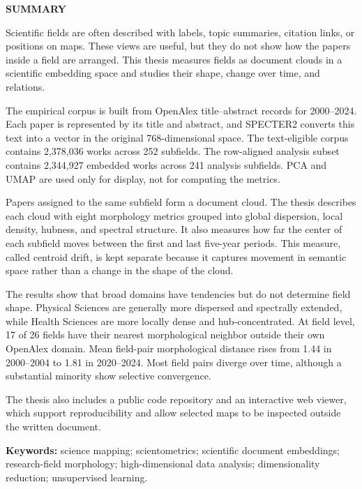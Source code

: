 \documentclass[12pt]{report} %
\begin{document}

\thispagestyle{plain}
\begin{center}
{\large\bfseries\uppercase{Summary}}
\end{center}

\noindent Scientific fields are often described with labels, topic summaries, citation links, or positions on maps. These views are useful, but they do not show how the papers inside a field are arranged. This thesis measures fields as document clouds in a scientific embedding space and studies their shape, change over time, and relations.

The empirical corpus is built from OpenAlex title--abstract records for 2000--2024. Each paper is represented by its title and abstract, and SPECTER2 converts this text into a vector in the original 768-dimensional space. The text-eligible corpus contains 2,378,036 works across 252 subfields. The row-aligned analysis subset contains 2,344,927 embedded works across 241 analysis subfields. PCA and UMAP are used only for display, not for computing the metrics.

Papers assigned to the same subfield form a document cloud. The thesis describes each cloud with eight morphology metrics grouped into global dispersion, local density, hubness, and spectral structure. It also measures how far the center of each subfield moves between the first and last five-year periods. This measure, called centroid drift, is kept separate because it captures movement in semantic space rather than a change in the shape of the cloud.

The results show that broad domains have tendencies but do not determine field shape. Physical Sciences are generally more dispersed and spectrally extended, while Health Sciences are more locally dense and hub-concentrated. At field level, 17 of 26 fields have their nearest morphological neighbor outside their own OpenAlex domain. Mean field-pair morphological distance rises from 1.44 in 2000--2004 to 1.81 in 2020--2024. Most field pairs diverge over time, although a substantial minority show selective convergence.

The thesis also includes a public code repository and an interactive web viewer, which support reproducibility and allow selected maps to be inspected outside the written document.

\begingroup\sloppy
\noindent\textbf{Keywords:} science mapping; scientometrics; scientific document embeddings; research-field morphology; high-dimensional data analysis; dimensionality reduction; unsupervised learning.
\par\endgroup
\end{document}
